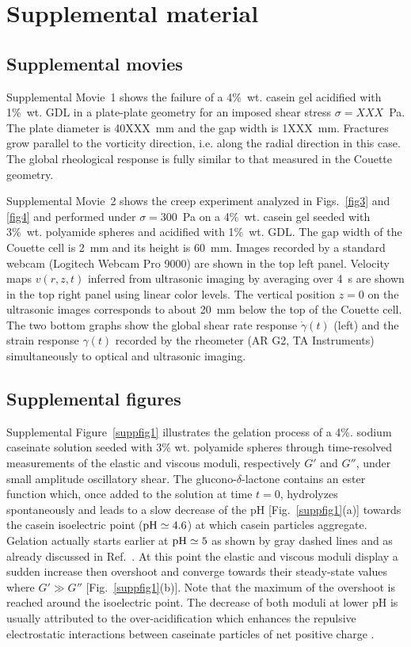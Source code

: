 \documentclass[twocolumn,superscriptaddress,showpacs,preprintnumbers,amsmath,amssymb,prl]{revtex4}
\newcommand\gp{\dot\gamma}
\begin{document}
\clearpage
\newpage
\setcounter{figure}{0}

\section*{\large Supplemental material}

\subsection*{Supplemental movies}

Supplemental Movie~1 shows the failure of a 4\%~wt. casein gel acidified with 1\%~wt. GDL in a plate-plate geometry for an imposed shear stress $\sigma=XXX$~Pa. The plate diameter is 40XXX~mm and the gap width is 1XXX~mm. Fractures grow parallel to the vorticity direction, i.e. along the radial direction in this case. The global rheological response is fully similar to that measured in the Couette geometry.

Supplemental Movie~2 shows the creep experiment analyzed in Figs.~\ref{fig3} and \ref{fig4} and performed under $\sigma=300$~Pa on a 4\%~wt. casein gel seeded with 3\%~wt. polyamide spheres and acidified with 1\%~wt. GDL. The gap width of the Couette cell is 2~mm and its height is 60~mm. Images recorded by a standard webcam (Logitech Webcam Pro 9000) are shown in the top left panel. Velocity maps $v(r,z,t)$ inferred from ultrasonic imaging by averaging over 4~s are shown in the top right panel using linear color levels. The vertical position $z=0$ on the ultrasonic images corresponds to about 20~mm below the top of the Couette cell. The two bottom graphs show the global shear rate response $\gp(t)$ (left) and the strain response $\gamma(t)$ recorded by the rheometer (AR G2, TA Instruments) simultaneously to optical and ultrasonic imaging.

\subsection*{Supplemental figures} 

Supplemental Figure~\ref{suppfig1} illustrates the gelation process of a 4\%. sodium caseinate solution seeded with 3\% wt. polyamide spheres through time-resolved measurements of the elastic and viscous moduli, respectively $G'$ and $G''$, under small amplitude oscillatory shear. The glucono-$\delta$-lactone contains an ester function which, once added to the solution at time $t=0$, hydrolyzes spontaneously and leads to a slow decrease of the pH [Fig.~\ref{suppfig1}(a)] towards the casein isoelectric point (${\rm pH}\simeq 4.6$) at which casein particles aggregate. Gelation actually starts earlier at ${\rm pH}\simeq 5$ as shown by gray dashed lines and as already discussed in Ref.~\cite{Lucey:1998supp}. At this point the elastic and viscous moduli display a sudden increase then overshoot and converge towards their steady-state values where $G'\gg G''$ [Fig.~\ref{suppfig1}(b)]. Note that the maximum of the overshoot is reached around the isoelectric point. The decrease of both moduli at lower pH is usually attributed to the over-acidification which enhances the repulsive electrostatic interactions between caseinate particles of net positive charge \cite{Dickinson:2002supp}.   
\end{document}
